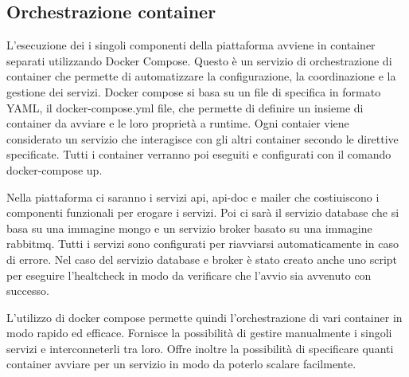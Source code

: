 \subsection{Orchestrazione container}
L'esecuzione dei i singoli componenti della piattaforma avviene in container separati utilizzando Docker Compose.
Questo è un servizio di orchestrazione di container che permette di automatizzare la configurazione, la coordinazione
e la gestione dei servizi. Docker compose si basa su un file di specifica in formato YAML, il docker-compose.yml file, che
permette di definire un insieme di container da avviare e le loro proprietà a runtime.
Ogni contaier viene considerato un servizio che interagisce con gli altri container secondo
le direttive specificate. Tutti i container verranno poi eseguiti e configurati con il comando docker-compose up.

Nella piattaforma ci saranno i servizi api, api-doc e mailer che costiuiscono i componenti funzionali per erogare i servizi.
Poi ci sarà il servizio database che si basa su una immagine mongo e un servizio broker basato su una immagine rabbitmq.
Tutti i servizi sono configurati per riavviarsi automaticamente in caso di errore. Nel caso del servizio database e broker è stato
creato anche uno script per eseguire l'healtcheck in modo da verificare che l'avvio sia avvenuto con successo.

L'utilizzo di docker compose permette quindi l'orchestrazione di vari container in modo rapido ed efficace. Fornisce la possibilità
di gestire manualmente i singoli servizi e interconneterli tra loro. Offre inoltre la possibilità di specificare quanti container
avviare per un servizio in modo da poterlo scalare facilmente.


